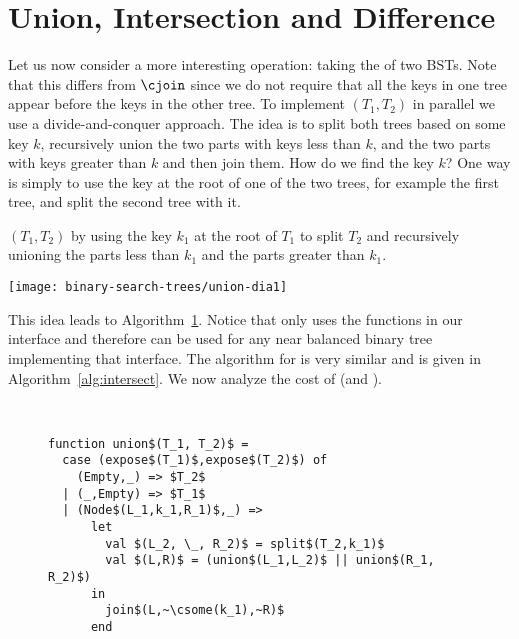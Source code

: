 \section{Union, Intersection and Difference}
\label{sec:union}

Let us now consider a more interesting operation: taking the
 of two BSTs.  Note that this differs from $\cjoin$ since
we do not require that all the keys in one tree appear before the
keys in the other tree.  To implement $(T_1,T_2)$ in
parallel we use a divide-and-conquer approach.  The idea is to split
both trees based on some key $k$, recursively union the two parts with
keys less than $k$, and the two parts with keys greater than $k$ and
then join them.  How do we find the key $k$?  One way is simply to use
the key at the root of one of the two trees, for example the first tree,
and split the second tree with it.
\begin{example}
$(T_1,T_2)$ by using the key $k_1$ at the root of $T_1$ to
split $T_2$ and recursively unioning the parts less than $k_1$ and the
parts greater than $k_1$.
\begin{center}
  \texttt{[image: binary-search-trees/union-dia1]}
\end{center}
\label{example:tree-union}
\end{example}
This idea leads to Algorithm~\ref{alg:union}.  
Notice that  only uses the functions in our
 interface and therefore can be used for any near
balanced binary tree implementing that interface.  The algorithm for
 is very similar and is given in
Algorithm~\ref{alg:intersect}.  We now analyze the cost of
 (and ).

\begin{figure}
\begin{algorithm}~
\label{alg:union}
\begin{lstlisting}
function union$(T_1, T_2)$ =
  case (expose$(T_1)$,expose$(T_2)$) of
    (Empty,_) => $T_2$
  | (_,Empty) => $T_1$
  | (Node$(L_1,k_1,R_1)$,_) =>
      let 
        val $(L_2, \_, R_2)$ = split$(T_2,k_1)$
        val $(L,R)$ = (union$(L_1,L_2)$ || union$(R_1, R_2)$)
      in 
        join$(L,~\csome(k_1),~R)$
      end
\end{lstlisting}
\end{algorithm}
\end{figure}

